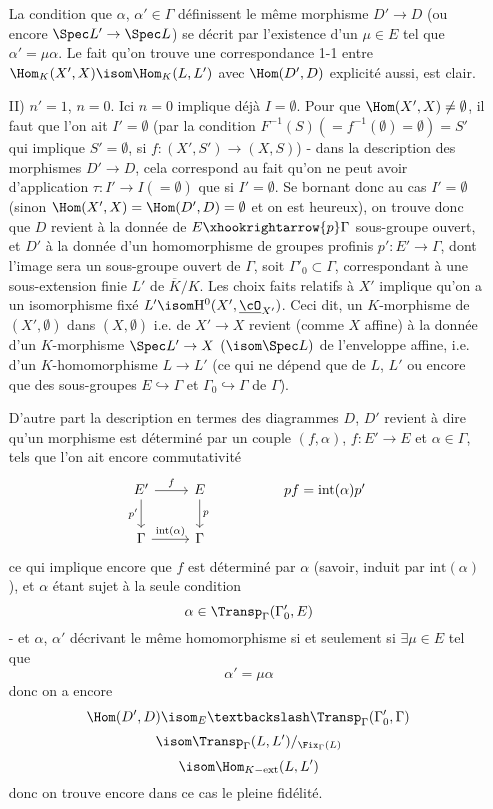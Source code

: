 \begin{enumerate}
    La condition que $\alpha$, $\alpha' \in \Gamma$ définissent le même morphisme $D' \to D$ (ou encore $\Spec L' \to \Spec L$) se décrit par l'existence d'un $\mu \in E$ tel que $\alpha' = \mu \alpha$. Le fait qu'on trouve une correspondance 1-1 entre $\Hom_K(X', X) \isom \Hom_K(L, L')$ avec $\Hom(D', D)$ explicité aussi, est clair.
    \item[II)] $n' = 1$, $n = 0$. Ici $n = 0$ implique déjà $I = \emptyset$. Pour que $\Hom(X', X) \neq \emptyset$, il faut que l'on ait $I' = \emptyset$ (par la condition $F^{-1}(S)(= f^{-1}(\emptyset) = \emptyset) = S'$ qui implique $S' = \emptyset$, si $f: (X', S') \to (X, S)$) - dans la description des morphismes $D' \to D$, cela correspond au fait qu'on ne peut avoir d'application $\tau: I' \to I (= \emptyset)$ que si $I' = \emptyset$. Se bornant donc au cas $I' = \emptyset$ (sinon $\Hom(X', X) = \Hom(D', D) = \emptyset$ et on est heureux), on trouve donc que $D$ revient à la donnée de $E \xhookrightarrow{p} \Gamma$ sous-groupe ouvert, et $D'$ à la donnée d'un homomorphisme de groupes profinis $p': E' \to \Gamma$, dont l'image sera un sous-groupe ouvert de $\Gamma$, soit $\Gamma'_0 \subset  \Gamma$, correspondant à une sous-extension finie $L'$ de $\overline{K}/K$. Les choix faits relatifs à $X'$ implique qu'on a un isomorphisme fixé $L' \isom \mathrm{H}^0(X', \underline{\cO}_{X'})$. Ceci dit, un $K$-morphisme de $(X', \emptyset)$ dans $(X, \emptyset)$ i.e. de $X' \to X$ revient (comme $X$ affine) à la donnée d'un $K$-morphisme $\Spec L' \to X$ $(\isom \Spec L)$ de l'enveloppe affine, i.e. d'un $K$-homomorphisme $L \to L'$ (ce qui ne dépend que de $L$, $L'$ ou encore que des sous-groupes $E \hookrightarrow \Gamma$ et $\Gamma_0 \hookrightarrow \Gamma$ de $\Gamma$).
    
    D'autre part la description en termes des diagrammes $D$, $D'$ revient à dire qu'un morphisme est déterminé par un couple $(f, \alpha)$, $f: E' \to E$ et $\alpha \in \Gamma$, tels que l'on ait encore commutativité
    \[\begin{tikzcd}
	{E'} & E && {pf = \text{int}(\alpha)p'} \\
	\Gamma & \Gamma
	\arrow["f", from=1-1, to=1-2]
	\arrow["{p'}"', from=1-1, to=2-1]
	\arrow["p", from=1-2, to=2-2]
	\arrow["{\text{int}(\alpha)}", from=2-1, to=2-2]
    \end{tikzcd}\]
    ce qui implique encore que $f$ est déterminé par $\alpha$ (savoir, induit par $\text{int}(\alpha)$), et $\alpha$ étant sujet à la seule condition
    $$
    \alpha \in \Transp_\Gamma (\Gamma'_0, E)
    $$
    - et $\alpha$, $\alpha'$ décrivant le même homomorphisme si et seulement si $\exists \mu \in E$ tel que
    $$
    \alpha' = \mu \alpha
    $$
    donc on a encore
    $$
    \Hom(D', D) \isom _E \textbackslash \Transp_\Gamma (\Gamma'_0, \Gamma)
    $$
    $$
    \isom \Transp_\Gamma (L, L')/_{\Fix_\Gamma(L)}
    $$
    $$
    \isom \Hom_{K-\text{ext}}(L, L')
    $$
    donc on trouve encore dans ce cas le pleine fidélité.
    

\end{enumerate}
